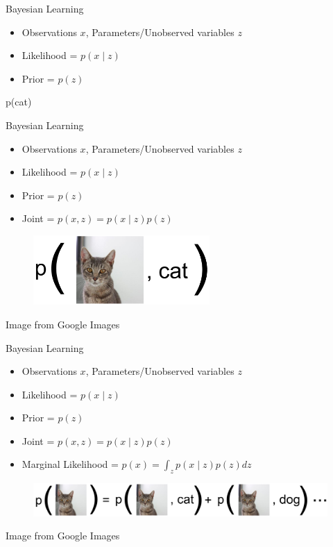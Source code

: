 \documentclass{beamer}
\begin{document}
\begin{frame}{Bayesian Learning}{}
    \begin{itemize}
        \item Observations $x$, Parameters/Unobserved variables $z$
        \item Likelihood = $p ( x \mid z )$
        \item Prior = $p ( z )$
    \end{itemize}

    \centering
    {\Huge p(cat)}

\end{frame}


\begin{frame}{Bayesian Learning}{}
    \begin{itemize}
        \item Observations $x$, Parameters/Unobserved variables $z$
        \item Likelihood = $p ( x \mid z )$
        \item Prior = $p ( z )$
        \item Joint = $p(x, z) = p(x \mid z) p(z)$
    \end{itemize}

    \begin{figure}
        \centering
        \includegraphics[width=0.6\textwidth]{bayes3}
    \end{figure}
    {\small Image from Google Images}
\end{frame}


\begin{frame}{Bayesian Learning}{}
    \begin{itemize}
        \item Observations $x$, Parameters/Unobserved variables $z$
        \item Likelihood = $p ( x \mid z )$
        \item Prior = $p ( z )$
        \item Joint = $p(x, z) = p(x \mid z) p(z)$
        \item Marginal Likelihood = $p(x) = \int_{z} p(x \mid z) p(z) dz$
    \end{itemize}

    \begin{figure}
        \centering
        \includegraphics[width=\textwidth]{bayes4}
    \end{figure}
    {\small Image from Google Images}
\end{frame}
\end{document}
